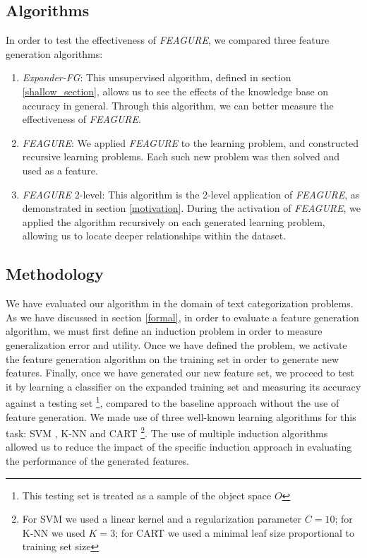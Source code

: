 \documentclass[twoside,11pt]{article}
\theoremstyle{definition}
\begin{document}
\subsection{Algorithms}

In order to test the effectiveness of \emph{FEAGURE}, we compared three feature generation algorithms:
\begin{enumerate}
	\item \emph{Expander-FG}: This unsupervised algorithm, defined in section \ref{shallow_section}, allows us to see the effects of the knowledge base on accuracy in general. Through this algorithm, we can better measure the effectiveness of \emph{FEAGURE}.
	\item \emph{FEAGURE}: We applied \emph{FEAGURE} to the learning problem, and constructed recursive learning problems. Each such new problem was then solved and used as a feature.
	\item \emph{FEAGURE} 2-level: This algorithm is the 2-level application of \emph{FEAGURE}, as demonstrated in section \ref{motivation}. During the activation of \emph{FEAGURE}, we applied the algorithm recursively on each generated learning problem, allowing us to locate deeper relationships within the dataset.
\end{enumerate}

\subsection{Methodology}

We have evaluated our algorithm in the domain of text categorization problems.
As we have discussed in section \ref{formal}, in order to evaluate a feature generation algorithm, we must first define an induction problem in order to measure generalization error and utility. Once we have defined the problem, we activate the feature generation algorithm on the training set in order to generate new features. Finally, once we have generated our new feature set, we proceed to test it by learning a classifier on the expanded training set and measuring its accuracy against a testing set \footnote{This testing set is treated as a sample of the object space $O$}, compared to the baseline approach without the use of feature generation. We made use of three well-known learning algorithms for this task: SVM \cite{cortes1995support}, K-NN \cite{fix1951discriminatory} and CART \cite{breiman1984classification}\footnote{For SVM we used a linear kernel and a regularization parameter $C=10$; for K-NN we used $K=3$; for CART we used a minimal leaf size proportional to training set size}.
The use of multiple induction algorithms allowed us to reduce the impact of the specific induction approach in evaluating the performance of the generated features.
\end{document}
